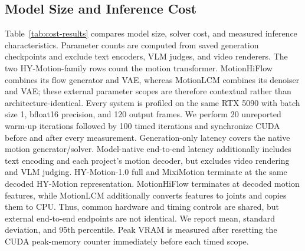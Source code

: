 \documentclass[runningheads]{llncs}
\begin{document}
\subsection{Model Size and Inference Cost}

Table~\ref{tab:cost-results} compares model size, solver cost, and measured
inference characteristics. Parameter counts are computed from saved generation
checkpoints and exclude text encoders, VLM judges, and video renderers. The two
HY-Motion-family rows count the motion transformer. MotionHiFlow combines its
flow generator and VAE, whereas MotionLCM combines its denoiser and VAE; these
external parameter scopes are therefore contextual rather than
architecture-identical. Every system is profiled on the same RTX 5090 with
batch size 1, bfloat16 precision, and 120 output frames. We perform 20
unreported warm-up iterations followed by 100 timed iterations and synchronize
CUDA before and after every measurement. Generation-only latency covers the
native motion generator/solver. Model-native end-to-end latency additionally
includes text encoding and each project's motion decoder, but excludes video
rendering and VLM judging. HY-Motion-1.0 full and MixiMotion terminate at the
same decoded HY-Motion representation. MotionHiFlow terminates at decoded
motion features, while MotionLCM additionally converts features to joints and
copies them to CPU. Thus, common hardware and timing controls are shared, but
external end-to-end endpoints are not identical. We report mean, standard
deviation, and 95th percentile. Peak VRAM is measured after resetting the CUDA
peak-memory counter immediately before each timed scope.
\end{document}
